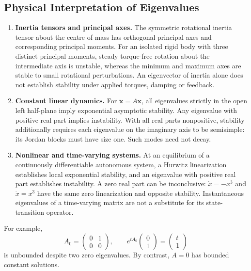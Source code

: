 \subsection{Physical Interpretation of Eigenvalues}
\label{subsec:eigen_physical}

\begin{enumerate}
    \item \textbf{Inertia tensors and principal axes.} The symmetric rotational inertia tensor about the centre of mass has orthogonal principal axes and corresponding principal moments. For an isolated rigid body with three distinct principal moments, steady torque-free rotation about the intermediate axis is unstable, whereas the minimum and maximum axes are stable to small rotational perturbations. An eigenvector of inertia alone does not establish stability under applied torques, damping or feedback.
    \item \textbf{Constant linear dynamics.} For $\dot{\mathbf x}=A\mathbf x$, all eigenvalues strictly in the open left half-plane imply exponential asymptotic stability. Any eigenvalue with positive real part implies instability. With all real parts nonpositive, stability additionally requires each eigenvalue on the imaginary axis to be semisimple: its Jordan blocks must have size one. Such modes need not decay.
    \item \textbf{Nonlinear and time-varying systems.} At an equilibrium of a continuously differentiable autonomous system, a Hurwitz linearization establishes local exponential stability, and an eigenvalue with positive real part establishes instability. A zero real part can be inconclusive: $\dot x=-x^3$ and $\dot x=x^3$ have the same zero linearization and opposite stability. Instantaneous eigenvalues of a time-varying matrix are not a substitute for its state-transition operator.
\end{enumerate}

For example,
\[
A_0=\begin{pmatrix}0&1\\0&0\end{pmatrix},
\qquad e^{tA_0}\begin{pmatrix}0\\1\end{pmatrix}
=\begin{pmatrix}t\\1\end{pmatrix}
\]
is unbounded despite two zero eigenvalues. By contrast, $A=0$ has bounded constant solutions.

